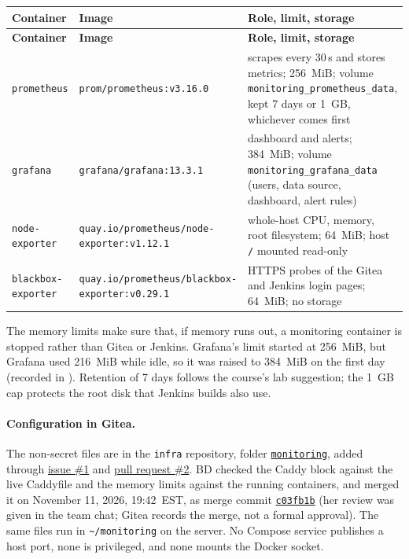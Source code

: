 \begin{tabularx}{\linewidth}{L{2.9cm}L{4.6cm}Y}
\caption{Monitoring containers, versions, and limits\label{Table:SreContainers}}\\
\toprule \textbf{Container} & \textbf{Image} & \textbf{Role, limit, storage}\\ \midrule
\endfirsthead
\toprule \textbf{Container} & \textbf{Image} & \textbf{Role, limit, storage}\\ \midrule
\endhead \bottomrule \endlastfoot
\texttt{prometheus} & \texttt{prom/prometheus:}\newline\texttt{v3.16.0} & scrapes every 30\,s and stores metrics; 256~MiB; volume \texttt{monitoring\_prometheus\_data}, kept 7 days or 1~GB, whichever comes first\\
\texttt{grafana} & \texttt{grafana/grafana:}\newline\texttt{13.3.1} & dashboard and alerts; 384~MiB; volume \texttt{monitoring\_grafana\_data} (users, data source, dashboard, alert rules)\\
\texttt{node-exporter} & \texttt{quay.io/prometheus/}\newline\texttt{node-exporter:v1.12.1} & whole-host CPU, memory, root filesystem; 64~MiB; host \texttt{/} mounted read-only\\
\texttt{blackbox-}\newline\texttt{exporter} & \texttt{quay.io/prometheus/}\newline\texttt{blackbox-exporter:v0.29.1} & HTTPS probes of the Gitea and Jenkins login pages; 64~MiB; no storage\\
\end{tabularx}

The memory limits make sure that, if memory runs out, a monitoring container is stopped rather than Gitea or Jenkins.
Grafana's limit started at 256~MiB, but Grafana used 216~MiB while idle, so it was raised to 384~MiB on the first day
(recorded in ). Retention of 7 days follows the course's lab suggestion; the 1~GB cap protects the root
disk that Jenkins builds also use.

\paragraph{Configuration in Gitea.} The non-secret files are in the \texttt{infra} repository, folder
\href{\GiteaURL/group1-startup/infra/src/branch/main/monitoring}{\texttt{monitoring}}, added through
\href{\GiteaURL/group1-startup/infra/issues/1}{issue \#1} and
\href{\GiteaURL/group1-startup/infra/pulls/2}{pull request \#2}. BD checked the Caddy block against the live
Caddyfile and the memory limits against the running containers, and merged it on November 11, 2026, 19:42~EST, as
merge commit \href{\GiteaURL/group1-startup/infra/commit/c03fb1b10e003554374404b7759cefa408214314}{\texttt{c03fb1b}}
(her review was given in the team chat; Gitea records the merge, not a formal approval). The same files run in \texttt{\textasciitilde/monitoring} on
the server. No Compose service publishes a host port, none is privileged, and none mounts the Docker socket.

